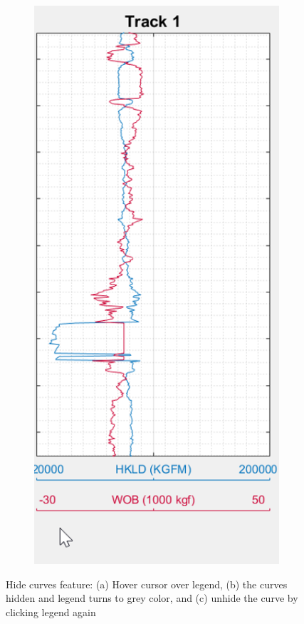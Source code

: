 \documentclass[12pt,a4paper,oneside]{report}
\begin{document}
\begin{figure}[H]
\begin{subfigure}[b]{0.31\textwidth}
    \caption{}
    \label{fig:f2}
  \end{subfigure}
   \hfill
  \begin{subfigure}[b]{0.31\textwidth}
    \includegraphics[width=\textwidth]{fig/3_hide.png}
    \caption{}
    \label{fig:f2}
  \end{subfigure}
  \caption{Hide curves feature: (a) Hover cursor over legend, (b) the curves hidden and legend turns to grey color, and (c) unhide the curve by clicking legend again}
  
\end{figure}
\end{document}
